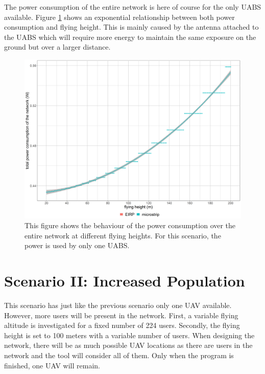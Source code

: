 The power consumption of the entire network is here of course for the only \gls{UABS} available. Figure \ref{fig:fhvspc} shows an 
exponential relationship between both power consumption and flying height. This  is mainly caused by the antenna 
attached to the \gls{UABS} which will require more energy to maintain the same exposure on the ground but over a larger distance.

\begin{figure}[t]
  \centering
  \includegraphics[width=\textwidth]{../results/s1/fhvspc.png}
  \caption{This figure shows the behaviour of the power consumption over the entire network at different flying  heights.
  For this scenario, the power is used by only one \gls{UABS}.}
  \label{fig:fhvspc}
\end{figure}


\FloatBarrier
\section{Scenario II: Increased Population}

This scenario has just like the previous scenario only one \gls{UAV} available. However, more users will be present in the network.
First, a variable flying altitude is investigated for a fixed number of 224 users. 
Secondly, the flying height is set to 100 meters with a variable number of users.
When designing the network, there will be as much possible \gls{UAV} locations as there are users in the network and the tool
will consider all of them. Only when the program is finished, one \gls{UAV} will remain.

